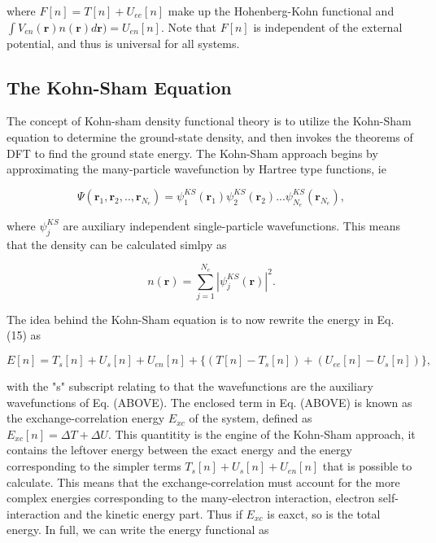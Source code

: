 where $F[n] = T[n] + U_{ee}[n]$ make up the Hohenberg-Kohn functional and $\int V_{en}(\boldsymbol{r})n(\boldsymbol{r})d\boldsymbol{r}) = U_{en}[n]$.
Note that $F[n]$ is independent of the external potential, and thus is universal for all systems.  

\subsection{The Kohn-Sham Equation}

The concept of Kohn-sham density functional theory is to utilize the Kohn-Sham equation to determine the ground-state density, and then invokes the theorems of DFT to find the ground state energy. The Kohn-Sham approach begins by approximating the many-particle wavefunction by Hartree type functions, ie 

\begin{equation}
    \Psi(\boldsymbol{r}_1, \boldsymbol{r}_2 , .., \boldsymbol{r}_{N_e}) = \psi_1^{KS}(\boldsymbol{r}_1)\psi_2^{KS}(\boldsymbol{r}_2)...\psi_{N_e}^{KS}(\boldsymbol{r}_{N_e}), 
\end{equation}

where $\psi_j^{KS}$ are auxiliary independent single-particle wavefunctions. This means that the density can be calculated simlpy as

\begin{equation}
n(\boldsymbol{r}) = \sum_{j=1}^{N_e} |\psi_{j}^{KS}(\boldsymbol{r})|^2.
\end{equation} 

The idea behind the Kohn-Sham equation is to now rewrite the energy in Eq. (15) as

\begin{equation}
    E[n] = T_s[n] + U_s[n] + U_{en}[n] + \bigg\{(T[n] - T_s[n]) + (U_{ee}[n] - U_s[n]) \bigg\}, 
\end{equation}

with the "s" subscript relating to that the wavefunctions are the auxiliary wavefunctions of Eq. (ABOVE). The enclosed term in Eq. (ABOVE) is known as the exchange-correlation energy $E_{xc}$ of the system, defined as $E_{xc}[n] = \Delta T + \Delta U$. This quantitity is the engine of the Kohn-Sham approach, it contains the leftover energy between the exact energy and the energy corresponding to the simpler terms $T_s[n] + U_s[n] + U_{en}[n]$ that is possible to calculate. This means that the exchange-correlation must account for the more complex energies corresponding to the many-electron interaction, electron self-interaction and the kinetic energy part. Thus if $E_{xc}$ is eaxct, so is the total energy. In full, we can write the energy functional as

